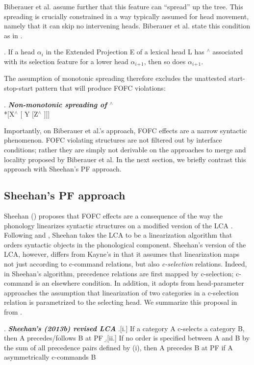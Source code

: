 \documentclass[output=paper]{langscibook}
\begin{document}
	Biberauer et al. assume further that this feature can ``spread'' up the tree.  This spreading is crucially constrained in a way typically assumed for head movement, namely that it can skip no intervening heads.  Biberauer et al. state this condition as in \Next.
  
\ex. 	If a head $\alpha_i$ in the Extended Projection E of a lexical head L has $^\wedge$ associated
with its selection feature for a lower head $\alpha$$_i$$_+$$_1$, then so does $\alpha_i$$_+$$_1$.
	
	The assumption of monotonic spreading therefore excludes the unattested start-stop-start pattern that will produce FOFC violations:

\ex. \textbf{\textit{Non-monotonic spreading of $^\wedge$}} \\ \protect\label{wedge} *[X$^\wedge$  [ Y [Z$^\wedge$ ]]]


	Importantly, on Biberauer et al.'s approach, FOFC effects are a narrow syntactic phenomenon. FOFC violating structures are not filtered out by interface conditions; rather they are simply not derivable on the approaches to merge and locality proposed by Biberauer et al.  In the next section, we briefly contrast this approach with Sheehan's PF approach.
	
\subsection{Sheehan's PF approach} \protect\label{sheehanpf}
	Sheehan (\citeyear{sheehan2013a,sheehan2013b,sheehan2017}) proposes that FOFC effects are a consequence of the way the phonology linearizes syntactic structures on a modified version of the LCA \cite{kayne1994}.   Following \cite{chomsky1995} and \cite{nunes2004}, Sheehan takes the LCA to be a linearization algorithm that orders syntactic objects in the phonological component. Sheehan's version of the LCA, however, differs from Kayne's in that it assumes that  linearization maps not just according to c-command relations, but also \textit{c-selection} relations.  Indeed, in Sheehan's algorithm, precedence relations are first mapped by c-selection; c-command is an elsewhere condition.  In addition, it adopts from head-parameter approaches the assumption that linearization of two categories in a c-selection relation is parametrized to the selecting head.  We summarize this proposal in \Next from \cite{sheehan2013a}.
	
\ex. \textbf{\textit{Sheehan's (2013b) revised LCA}}  \protect\label{lca}
\a.[i.] If a category A c-selects a category B, then A precedes/follows B at PF
\b.[ii.] If no order is specified between A and B by the sum of all precedence pairs
defined by (i), then A precedes B at PF if A asymmetrically c-commands B	
	
\end{document}
